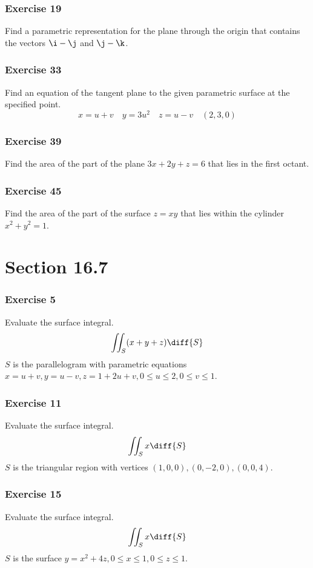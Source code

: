 \documentclass{math}
\begin{document}
\subsubsection*{Exercise 19}
Find a parametric representation for the plane through the origin that contains
the vectors \( \i-\j \) and \( \j-\k \).

\subsubsection*{Exercise 33}
Find an equation of the tangent plane to the given parametric surface at the
specified point.
\[ x = u+v \quad y = 3u^2 \quad z = u-v \quad (2,3,0) \]

\subsubsection*{Exercise 39}
Find the area of the part of the plane \( 3x+2y+z = 6 \) that lies in the first
octant.

\subsubsection*{Exercise 45}
Find the area of the part of the surface \( z = xy \) that lies within the
cylinder \( x^2+y^2 = 1 \).

\section*{Section 16.7}

\subsubsection*{Exercise 5}
Evaluate the surface integral.
\[ \iint_{S}(x+y+z)\diff{S} \]
\( S \) is the parallelogram with parametric equations \( x = u+v, y = u-v,
z = 1+2u+v, 0\le u\le 2, 0\le v\le 1 \).

\subsubsection*{Exercise 11}
Evaluate the surface integral.
\[ \iint_{S}x\diff{S} \]
\( S \) is the triangular region with vertices \( (1,0,0),(0,-2,0),(0,0,4) \).

\subsubsection*{Exercise 15}
Evaluate the surface integral.
\[ \iint_{S}x\diff{S} \]
\( S \) is the surface \( y = x^2+4z,0\le x\le1,0\le z\le 1 \).
\end{document}
